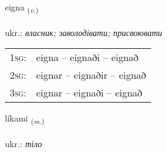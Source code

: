 \documentclass[frontgrid, backgrid]{flacards}\usepackage[]{graphicx}\usepackage[]{xcolor}
\begin{document}
\renewcommand{\flhead}{\vskip5pt \fboxsep=0pt {\small\bfseries\footnotesize Sagnorð | дієслово}}
\renewcommand{\fcfoot}{\vskip5pt \fboxsep=0pt \hspace{2pt}{\small\bfseries\footnotesize 1K}}

\renewcommand{\blhead}{\vskip5pt {\small\bfseries\footnotesize Sagnorð | дієслово }}
\renewcommand{\bcfoot}{\vskip5pt \hspace{2pt}{\small\bfseries\footnotesize 1K}}


{eigna \small{\textsubscript{(\textit{v.})}} \\[1ex] %
\textphonetic{[eikna]} \\
ukr.: \emph{власник; заволодівати; присвоювати} \\  [2ex]
\renewcommand*{\arraystretch}{0.8}
\begin{tabular}{p{1cm}l}
\textsc{1sg}: & eigna -- eignaði -- eignað \\ 
\textsc{2sg}: & eignar -- eignaðir -- eignað \\ 
\textsc{3sg}: & eignar -- eignaði -- eignað \\ 
\end{tabular}
}

\renewcommand{\flhead}{\vskip5pt \fboxsep=0pt {\small\bfseries\footnotesize Nafnorð | іменник}}
\renewcommand{\fcfoot}{\vskip5pt \fboxsep=0pt \hspace{2pt}{\small\bfseries\footnotesize 1K}}

\renewcommand{\blhead}{\vskip5pt {\small\bfseries\footnotesize Nafnorð | іменник }}
\renewcommand{\bcfoot}{\vskip5pt \hspace{2pt}{\small\bfseries\footnotesize 1K}}


{líkami \small{\textsubscript{(\textit{m.})}} \\[1ex] %
\textphonetic{[liːkamɪ]} \\
ukr.: \emph{тіло} \\  [2ex]
\renewcommand*{\arraystretch}{0.8}
}
\end{document}
